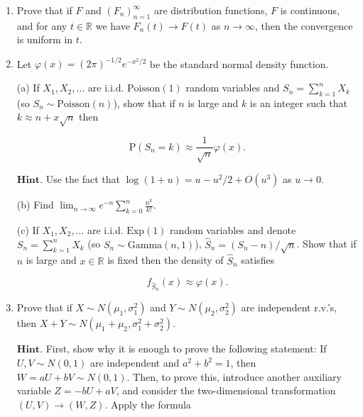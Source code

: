\documentclass[11pt]{report}
\newcommand{\R}{\mathbb{R}}
\theoremstyle{plain}
\theoremstyle{definition}
\begin{document}
\begin{enumerate}[label=\arabic*.]
$\textbf{Theorem (The Law of the Iterated Logarithm;
A. Y. Khinchin, 1924).}$

\[
\mathrm{P}\left(\limsup_{n\to\infty} \frac{S_n}{\sqrt{2n \log\log n}} = 1\right) = 1.
\]

Therefore, by symmetry, also

\[
\mathrm{P}\left(\liminf_{n\to\infty} \frac{S_n}{\sqrt{2n \log\log n}} = -1\right) = 1.
\]

It follows in particular that, almost surely, the
random walk will cross the origin infinitely many
times.

\item Prove that if $F$ and $(F_n)_{n=1}^\infty$ are
distribution functions, $F$ is continuous, and for
any $t\in \R$ we have $F_n(t)\to F(t)$ as
$n\to\infty$, then the convergence is uniform in $t$.

\item Let $\varphi(x)=(2\pi)^{-1/2} e^{-x^2/2}$ be the
standard normal density function.

(a) If $X_1,X_2,\ldots$ are i.i.d.
$\textrm{Poisson}(1)$ random variables and
$S_n=\sum_{k=1}^n X_k$ (so
$S_n \sim \textrm{Poisson}(n)$), show that if $n$ is
large and $k$ is an integer such that
$k\approx n+x\sqrt{n}$ then

\[
\mathrm{P}(S_n=k) \approx \frac{1}{\sqrt{n}} \varphi(x).
\]

$\textbf{Hint.}$ Use the fact that
$\log(1+u)=u-u^2/2 + O(u^3)$ as $u\to 0$.

(b) Find
$\lim_{n\to\infty} e^{-n} \sum_{k=0}^n
\frac{n^k}{k!}$.

(c) If $X_1,X_2,\ldots$ are i.i.d. $\textrm{Exp}(1)$
random variables and denote $S_n=\sum_{k=1}^n X_k$
(so $S_n \sim \textrm{Gamma}(n,1)$),
$\hat{S}_n = (S_n-n)/\sqrt{n}$. Show that if $n$ is
large and $x\in \R$ is fixed then the density of
$\hat{S}_n$ satisfies

\[
f_{\hat{S}_n}(x) \approx \varphi(x).
\]

\item Prove that if $X\sim N(\mu_1, \sigma_1^2)$ and
$Y\sim N(\mu_2, \sigma_2^2)$ are independent r.v.'s,
then $X+Y \sim N(\mu_1+\mu_2, \sigma_1^2+\sigma_2^2)$.

$\textbf{Hint.}$ First, show why it is enough to
prove the following statement: If $U,V \sim N(0,1)$
are independent and $a^2+b^2 = 1$, then
$W=aU+bV \sim N(0,1)$. Then, to prove this, introduce
another auxiliary variable $Z=-bU+aV$, and consider
the two-dimensional transformation $(U,V)\to(W,Z)$.
Apply the formula


\end{enumerate}
\end{document}
